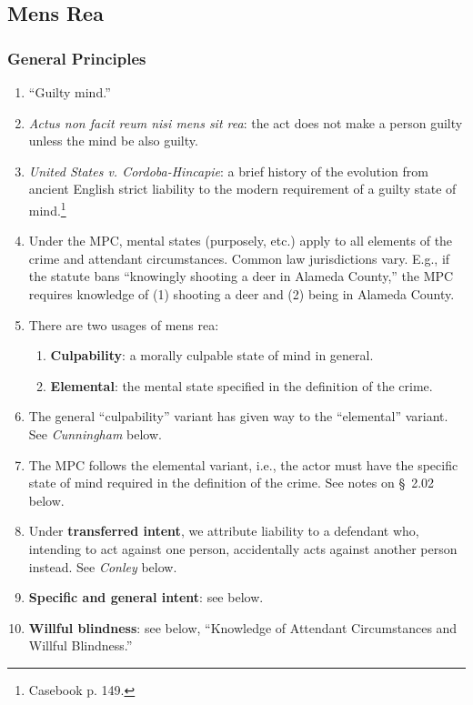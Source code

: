 \subsection{Mens Rea}

\subsubsection{General Principles}

\begin{enumerate}
    \item ``Guilty mind.''
    \item \emph{Actus non facit reum nisi mens sit rea}: the act does not make 
    a person guilty unless the mind be also guilty.
    \item \emph{United States v. Cordoba-Hincapie}: a brief history of the 
    evolution from ancient English strict liability to the modern requirement 
    of a guilty state of mind.\footnote{Casebook p. 149.}
    \item Under the MPC, mental states (purposely, etc.) apply to all elements 
    of the crime and attendant circumstances. Common law jurisdictions vary. 
    E.g., if the statute bans ``knowingly shooting a deer in Alameda County,'' 
    the MPC requires knowledge of (1) shooting a deer and (2) being in 
    Alameda County.
    \item There are two usages of mens rea:
    \begin{enumerate}
        \item \textbf{Culpability}: a morally culpable state of mind in 
        general.
        \item \textbf{Elemental}: the mental state specified in the definition 
        of the crime.
    \end{enumerate}
    \item The general ``culpability'' variant has given way to the 
    ``elemental'' variant. See \emph{Cunningham} below.
    \item The MPC follows the elemental variant, i.e., the actor must have the 
    specific state of mind required in the definition of the crime. See 
    notes on \S\ 2.02 below.
    \item Under \textbf{transferred intent}, we attribute liability to a 
    defendant who, intending to act against one person, accidentally acts 
    against another person instead. See \emph{Conley} below.
    \item \textbf{Specific and general intent}: see below.
    \item \textbf{Willful blindness}: see below, ``Knowledge of Attendant 
    Circumstances and Willful Blindness.''
\end{enumerate}

